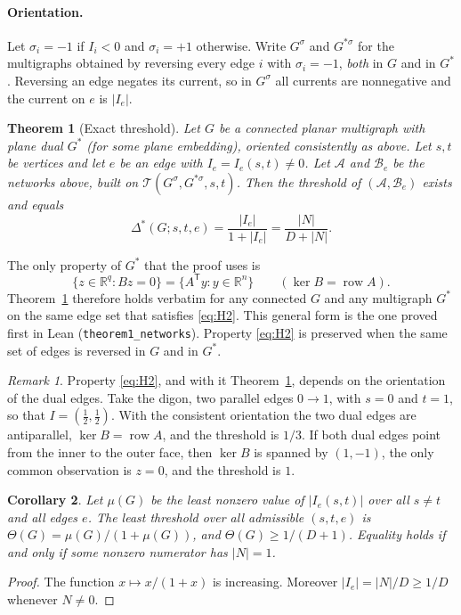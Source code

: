\documentclass[11pt]{amsart}
\theoremstyle{plain}
\newtheorem{theorem}{Theorem}
\newtheorem{corollary}[theorem]{Corollary}
\theoremstyle{definition}
\theoremstyle{remark}
\newtheorem{remark}{Remark}
\newcommand{\R}{\mathbb{R}}
\newcommand{\T}{\mathsf{T}}
\newcommand{\row}{\operatorname{row}}
\newcommand{\code}[1]{\texttt{#1}}
\begin{document}
\paragraph{Orientation.} Let $\sigma_i=-1$ if $I_i<0$ and $\sigma_i=+1$ otherwise. Write $G^\sigma$ and
$G^{\ast\sigma}$ for the multigraphs obtained by reversing every edge $i$ with $\sigma_i=-1$, \emph{both} in $G$
and in $G^\ast$. Reversing an edge negates its current, so in $G^\sigma$ all currents are nonnegative and the
current on $e$ is $|I_e|$.

\begin{theorem}[Exact threshold]\label{thm:main}
Let $G$ be a connected planar multigraph with plane dual $G^\ast$ (for some plane embedding), oriented
consistently as above. Let $s,t$ be vertices
and let $e$ be an edge with $I_e=I_e(s,t)\neq 0$. Let $\mathcal A$ and $\mathcal B_e$ be the networks above, built
on $\mathcal T(G^\sigma,G^{\ast\sigma},s,t)$. Then the threshold of $(\mathcal A,\mathcal B_e)$ exists and equals
\[
\Delta^*(G;s,t,e)=\frac{|I_e|}{1+|I_e|}=\frac{|N|}{D+|N|}.
\]
\end{theorem}

The only property of $G^\ast$ that the proof uses is
\begin{equation}\label{eq:H2}
\{z\in\R^q : Bz=0\}=\{A^{\T}y : y\in\R^n\}\qquad(\ker B=\row A). \tag{H2}
\end{equation}
Theorem~\ref{thm:main} therefore holds verbatim for any connected $G$ and any multigraph $G^\ast$ on the same edge
set that satisfies \eqref{eq:H2}. This general form is the one proved first in Lean (\code{theorem1\_networks}).
Property \eqref{eq:H2} is preserved when the same set of edges is reversed in $G$ and in $G^\ast$.

\begin{remark}\label{rem:orient}
Property \eqref{eq:H2}, and with it Theorem~\ref{thm:main}, depends on the orientation of the dual edges. Take
the digon, two parallel edges $0\to1$, with $s=0$ and $t=1$, so that $I=(\tfrac12,\tfrac12)$. With the consistent
orientation the two dual edges are antiparallel, $\ker B=\row A$, and the threshold is $1/3$. If both dual edges
point from the inner to the outer face, then $\ker B$ is spanned by $(1,-1)$, the only common observation is
$z=0$, and the threshold is $1$.
\end{remark}

\begin{corollary}\label{cor:theta}
Let $\mu(G)$ be the least nonzero value of $|I_e(s,t)|$ over all $s\neq t$ and all edges $e$. The least
threshold over all admissible $(s,t,e)$ is $\Theta(G)=\mu(G)/(1+\mu(G))$, and $\Theta(G)\ge 1/(D+1)$. Equality
holds if and only if some nonzero numerator has $|N|=1$.
\end{corollary}
\begin{proof}
The function $x\mapsto x/(1+x)$ is increasing. Moreover $|I_e|=|N|/D\ge 1/D$ whenever $N\neq 0$.
\end{proof}
\end{document}
